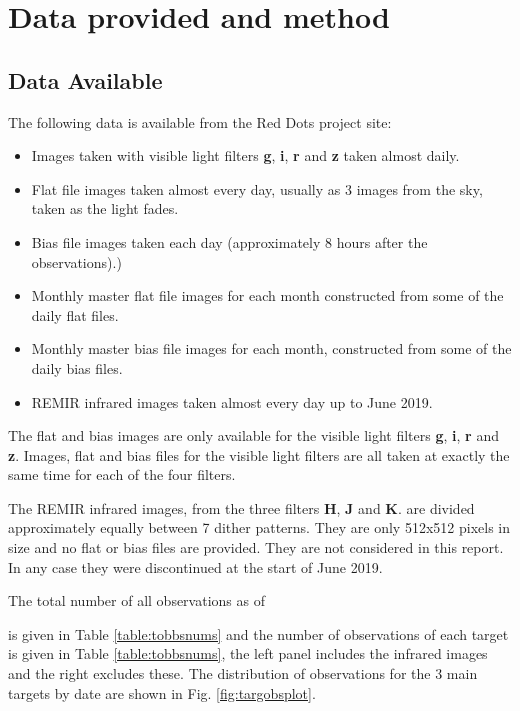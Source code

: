 \section{Data provided and method}
\protect\label{section:tdataprovided}

\subsection{Data Available}

The following data is available from the Red Dots project site:

\begin{itemize}
  \item Images taken with visible light filters \textbf{g},
\textbf{i}, \textbf{r} and \textbf{z} taken almost daily.
\item Flat file images taken almost every day, usually as 3 images from the sky,
taken as the light fades.
\item Bias file images taken each day (approximately 8 hours after the
observations).)
\item Monthly master flat file images for each month constructed from some of
the daily flat files.
\item Monthly master bias file images for each month, constructed from some of
the daily bias files.
\item REMIR infrared images taken almost every day up to June 2019.
\end{itemize}

The flat and bias images are only available for the visible light filters \textbf{g},
\textbf{i}, \textbf{r} and \textbf{z}.
Images, flat and bias files for the visible light filters are all taken at
exactly the same time for each of the four filters.

The REMIR infrared images, from the three filters \textbf{H}, \textbf{J} and
\textbf{K}. are divided approximately equally between 7 dither patterns. They
are only 512x512 pixels in size and no flat or bias files are provided. They are
not considered in this report. In any case they were discontinued at the start
of June 2019.

The total number of all observations as of \date{\today} is given in Table
\ref{table:tobbsnums} and the number of observations of each target is given in
Table \ref{table:tobbsnums}, the left panel includes the infrared images and the
right excludes these. The distribution of observations for the 3 main targets by date are shown in
Fig. \ref{fig:targobsplot}.

